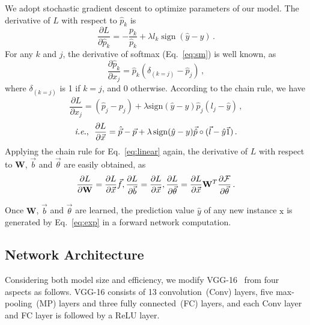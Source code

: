 \documentclass[5p,times,twocolumn]{elsarticle}
\DeclareMathOperator*{\sign}{sign}
\begin{document}
We adopt stochastic gradient descent to optimize parameters of our model. The derivative of $L$ with respect to $\hat p_k$ is
\begin{equation}\label{eq:loss}
\frac {\partial {L}}{\partial{\hat p_k}} = -\frac{p_k}{\hat p_k} + \lambda l_k \sign(\hat y- y)\,.
\end{equation}
For any $k$ and $j$, the derivative of softmax (Eq.~\eqref{eq:sm}) is well known, as
\begin{equation}
\frac {\partial {\hat p_k}}{\partial{x_j}} = \hat p_k(\delta_{(k=j)}-\hat p_j)\,,
\end{equation}
where $\delta_{(k=j)}$ is 1 if $k=j$, and 0 otherwise. According to the chain rule, we have
\begin{equation}
\frac {\partial L}{\partial{x_j}} = (\hat p_j -p_j) + \lambda \text{sign}(\hat y- y)\hat p_j(l_j-\hat y)\,,
\end{equation}
\begin{equation}
\text{\emph{i.e.},}~~\frac {\partial L}{\partial \vec x} = \hat{\vec p} -\vec p + \lambda \sign(\hat y- y)\vec {\hat p}\circ(\vec l-\hat y\vec 1)\,.
\end{equation}
Applying the chain rule for Eq.~\eqref{eq:linear} again, the derivative of $L$ with respect to $\mathbf W$, $\vec b$ and $\vec \theta$ are easily obtained, as
\begin{equation}
\frac {\partial L}{\partial{\mathbf W}} =\frac {\partial L}{\partial \vec x}\vec f,\\
\frac {\partial L}{\partial{\vec b}} =\frac {\partial L}{\partial \vec x},\\
\frac {\partial L}{\partial{\vec 
\theta}}  =\frac {\partial L}{\partial \vec x}\mathbf W^{T}\frac{\partial \mathcal{F}}{\partial \vec \theta}\,.
\end{equation}

Once $\mathbf W$, $\vec b$ and $\vec \theta$ are learned, the prediction value $\hat y$ of any new
instance $\mathrm x$ is generated by Eq.~\eqref{eq:exp} in a forward network computation.

\subsection{Network Architecture}
Considering both model size and efficiency, we modify VGG-16~\cite{simonyan2015very} from four aspects as follows. VGG-16 consists of 13 convolution~(Conv) layers, five max-pooling~(MP) layers and three fully connected~(FC) layers, and each Conv layer and FC layer is followed by a ReLU layer.
\end{document}
